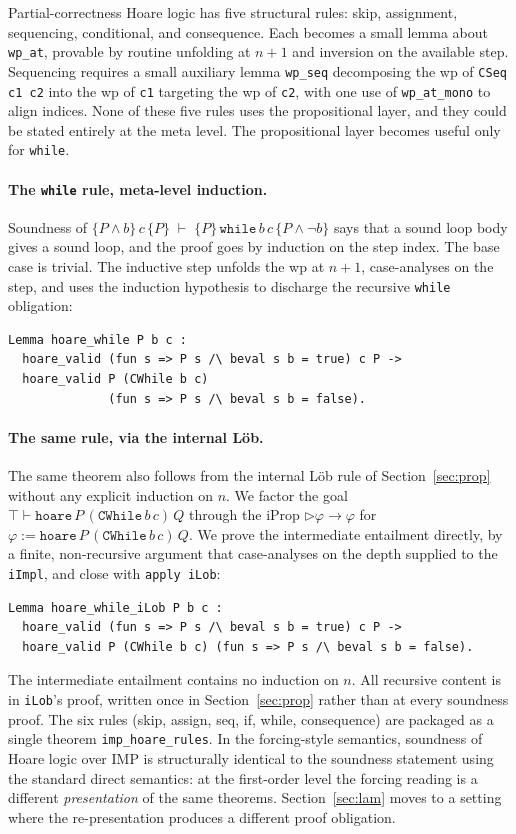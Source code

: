 Partial-correctness Hoare logic has five structural rules: skip,
assignment, sequencing, conditional, and consequence.  Each becomes a
small lemma about \texttt{wp\_at}, provable by routine unfolding at
$n+1$ and inversion on the available step.  Sequencing requires a
small auxiliary lemma \texttt{wp\_seq} decomposing the wp of
\texttt{CSeq c1 c2} into the wp of \texttt{c1} targeting the wp of
\texttt{c2}, with one use of \texttt{wp\_at\_mono} to align indices.
None of these five rules uses the propositional layer, and they
could be stated entirely at the meta level.  The propositional layer
becomes useful only for \texttt{while}.

\paragraph{The \texttt{while} rule, meta-level induction.}
Soundness of
$\{P \wedge b\}\, c\, \{P\} \;\vdash\; \{P\}\, \mathtt{while}\, b\, c\, \{P \wedge \neg b\}$
says that a sound loop body gives a sound loop, and the proof goes by
induction on the step index.  The base case is trivial. The inductive
step unfolds the wp at $n+1$, case-analyses on the step, and uses the
induction hypothesis to discharge the recursive \texttt{while}
obligation:
\begin{lstlisting}
Lemma hoare_while P b c :
  hoare_valid (fun s => P s /\ beval s b = true) c P ->
  hoare_valid P (CWhile b c)
              (fun s => P s /\ beval s b = false).
\end{lstlisting}

\paragraph{The same rule, via the internal Löb.}
The same theorem also follows from the internal Löb rule of
Section~\ref{sec:prop} without any explicit induction on $n$.  We
factor the goal $\top \vdash \mathtt{hoare}\, P\, (\mathtt{CWhile}\,
b\, c)\, Q$ through the iProp $\triangleright \varphi \to \varphi$ for
$\varphi := \mathtt{hoare}\, P\, (\mathtt{CWhile}\, b\, c)\, Q$. We
prove the intermediate entailment directly, by a finite, non-recursive
argument that case-analyses on the depth supplied to the
\texttt{iImpl}, and close with \texttt{apply iLob}:
\begin{lstlisting}
Lemma hoare_while_iLob P b c :
  hoare_valid (fun s => P s /\ beval s b = true) c P ->
  hoare_valid P (CWhile b c) (fun s => P s /\ beval s b = false).
\end{lstlisting}
\noindent
The intermediate entailment contains no induction on $n$.  All recursive content
is in \texttt{iLob}'s proof, written once in
Section~\ref{sec:prop} rather than at every soundness proof.  The six
rules (skip, assign, seq, if, while, consequence) are packaged as a
single theorem \texttt{imp\_hoare\_rules}.  In the forcing-style
semantics, soundness of Hoare logic over IMP is structurally
identical to the soundness statement using the standard direct
semantics: at the first-order level the forcing reading is a
different \emph{presentation} of the same theorems.
Section~\ref{sec:lam} moves to a setting where the re-presentation
produces a different proof obligation.
